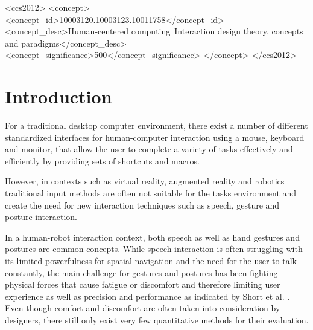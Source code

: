 \documentclass{sig-alternate-05-2015}
\begin{document}
%
%
\begin{CCSXML}
<ccs2012>
<concept>
<concept_id>10003120.10003123.10011758</concept_id>
<concept_desc>Human-centered computing~Interaction design theory, concepts and paradigms</concept_desc>
<concept_significance>500</concept_significance>
</concept>
</ccs2012>
\end{CCSXML}






%
%

%
%
\printccsdesc



\section{Introduction}

For a traditional desktop computer environment, there exist a number of different standardized interfaces for human-computer interaction using a mouse, keyboard and monitor, that allow the user to 
complete a variety of tasks effectively and efficiently by providing sets of shortcuts and macros. 

However, in contexts such as virtual reality, augmented reality and robotics traditional input methods are often not suitable for the tasks environment and create the need for new interaction techniques such as speech, gesture and posture interaction. 

In a human-robot interaction context, both speech as well as hand gestures and postures are common concepts. While speech interaction is often struggling with its limited powerfulness for spatial navigation and the need for the user to talk constantly, the main challenge for gestures and postures has been fighting physical forces that cause fatigue or discomfort and therefore limiting user experience as well as precision and performance as indicated by Short et al. \cite{short1999precision}. Even though comfort and discomfort are often taken into consideration by designers, there still only exist very few quantitative methods for their evaluation\cite{naddeo2015proposal}.
\end{document}
